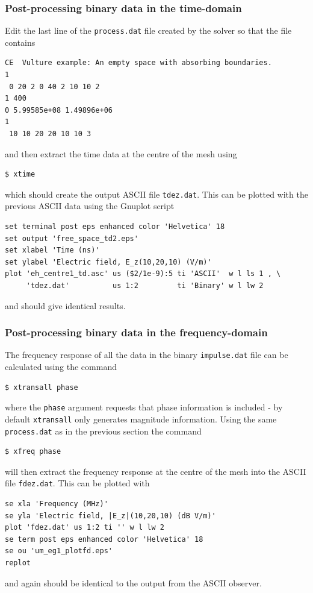 \documentclass[onecolumn,a4paper]{article}
\numberwithin{equation}{section}
\begin{document}
\subsubsection{Post-processing binary data in the time-domain}

Edit the last line of the \texttt{process.dat} file created by the solver so that the file contains
\begin{verbatim}
CE  Vulture example: An empty space with absorbing boundaries.
1
 0 20 2 0 40 2 10 10 2
1 400
0 5.99585e+08 1.49896e+06
1
 10 10 20 20 10 10 3
\end{verbatim}
and then extract the time data at the centre of the mesh using
\begin{verbatim}
$ xtime
\end{verbatim}
which should create the output ASCII file \texttt{tdez.dat}.
This can be plotted with the previous ASCII data using the Gnuplot script
\begin{verbatim}
set terminal post eps enhanced color 'Helvetica' 18
set output 'free_space_td2.eps'
set xlabel 'Time (ns)'
set ylabel 'Electric field, E_z(10,20,10) (V/m)'
plot 'eh_centre1_td.asc' us ($2/1e-9):5 ti 'ASCII'  w l ls 1 , \
     'tdez.dat'          us 1:2         ti 'Binary' w l lw 2
\end{verbatim}
and should give identical results.

\subsubsection{Post-processing binary data in the frequency-domain}

The frequency response of all the data in the binary \texttt{impulse.dat}
file can be calculated using the command
\begin{verbatim}
$ xtransall phase
\end{verbatim}
where the \texttt{phase} argument requests that phase information is included - 
by default \texttt{xtransall} only generates magnitude information. Using the same \texttt{process.dat}
as in the previous section the command
\begin{verbatim}
$ xfreq phase
\end{verbatim}
will then extract the frequency response at the centre of the mesh into
the ASCII file \texttt{fdez.dat}. This can be plotted with
\begin{verbatim}
se xla 'Frequency (MHz)'
se yla 'Electric field, |E_z|(10,20,10) (dB V/m)'
plot 'fdez.dat' us 1:2 ti '' w l lw 2
se term post eps enhanced color 'Helvetica' 18
se ou 'um_eg1_plotfd.eps'
replot
\end{verbatim}
and again should be identical to the output from the ASCII observer.
\end{document}
